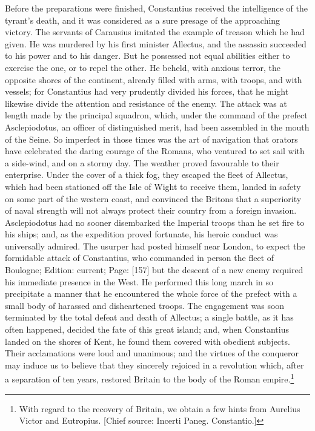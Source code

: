 Before the preparations were finished, Constantius received the intelligence of the tyrant\texthebrew{}’s death, and it was considered as a sure presage of the approaching victory. The servants of Carausius imitated the example of treason which he had given. He was murdered by his first minister Allectus, and the assassin succeeded to his power and to his danger. But he possessed not equal abilities either to exercise the one, or to repel the other. He beheld, with anxious terror, the opposite shores of the continent, already filled with arms, with troops, and with vessels; for Constantius had very prudently divided his forces, that he might likewise divide the attention and resistance of the enemy. The attack was at length made by the principal squadron, which, under the command of the prefect Asclepiodotus, an officer of distinguished merit, had been assembled in the mouth of the Seine. So imperfect in those times was the art of navigation that orators have celebrated the daring courage of the Romans, who ventured to set sail with a side-wind, and on a stormy day. The weather proved favourable to their enterprise. Under the cover of a thick fog, they escaped the fleet of Allectus, which had been stationed off the Isle of Wight to receive them, landed in safety on some part of the western coast, and convinced the Britons that a superiority of naval strength will not always protect their country from a foreign invasion. Asclepiodotus had no sooner disembarked the Imperial troops than he set fire to his ships; and, as the expedition proved fortunate, his heroic conduct was universally admired. The usurper had posted himself near London, to expect the formidable attack of Constantius, who commanded in person the fleet of Boulogne; Edition: current; Page: [157] but the descent of a new enemy required his immediate presence in the West. He performed this long march in so precipitate a manner that he encountered the whole force of the prefect with a small body of harassed and disheartened troops. The engagement was soon terminated by the total defeat and death of Allectus; a single battle, as it has often happened, decided the fate of this great island; and, when Constantius landed on the shores of Kent, he found them covered with obedient subjects. Their acclamations were loud and unanimous; and the virtues of the conqueror may induce us to believe that they sincerely rejoiced in a revolution which, after a separation of ten years, restored Britain to the body of the Roman empire.\footnote{With regard to the recovery of Britain, we obtain a few hints from Aurelius Victor and Eutropius. [Chief source: Incerti Paneg. Constantio.]}

